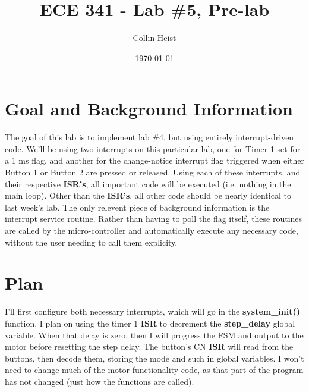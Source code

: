 \documentclass[a4paper, 12pt]{article}
\begin{document}
\title{ECE 341 - Lab \#5, Pre-lab}
\author{Collin Heist}
\date{\today}
\maketitle
{}

\section{Goal and Background Information}
The goal of this lab is to implement lab \#4, but using entirely interrupt-driven code. We'll be using two interrupts on this particular lab, one for Timer 1 set for a 1 ms flag, and another for the change-notice interrupt flag triggered when either Button 1 or Button 2 are pressed or released. Using each of these interrupts, and their respective \textbf{ISR's}, all important code will be executed (i.e. nothing in the main loop). Other than the \textbf{ISR's}, all other code should be nearly identical to last week's lab. The only relevent piece of background information is the interrupt service routine. Rather than having to poll the flag itself, these routines are called by the micro-controller and automatically execute any necessary code, without the user needing to call them explicity.

\section{Plan}
I'll first configure both necessary interrupts, which will go in the \textbf{system\_init()} function. I plan on using the timer 1 \textbf{ISR} to decrement the \textbf{step\_delay} global variable. When that delay is zero, then I will progress the FSM and output to the motor before resetting the step delay. The button's CN \textbf{ISR} will read from the buttons, then decode them, storing the mode and such in global variables. I won't need to change much of the motor functionality code, as that part of the program has not changed (just how the functions are called).
\end{document}
